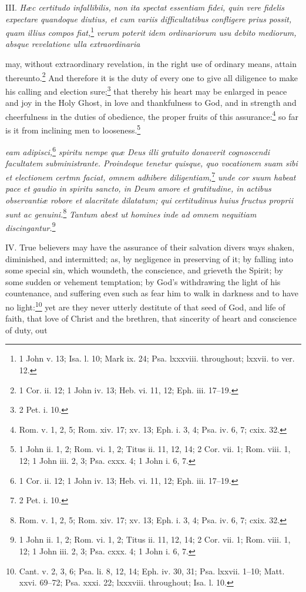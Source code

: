 III. \emph{Hæc certitudo infallibilis, non ita spectat essentiam fidei, quin vere fidelis expectare quandoque diutius, et cum variis difficultatibus confligere prius possit, quam illius compos fiat,}\footnote{1 John v. 13; Isa. l. 10; Mark ix. 24; Psa. lxxxviii. throughout; lxxvii. to ver. 12.}\emph{ verum poterit idem ordinariorum usu debito mediorum, absque revelatione ulla extraordinaria }

may, without extraordinary revelation, in the right use of ordinary means, attain thereunto.\footnote{1 Cor. ii. 12; 1 John iv. 13; Heb. vi. 11, 12; Eph. iii. 17–19.} And therefore it is the duty of every one to give all diligence to make his calling and election sure;\footnote{2 Pet. i. 10.} that thereby his heart may be enlarged in peace and joy in the Holy Ghost, in love and thankfulness to God, and in strength and cheerfulness in the duties of obedience, the proper fruits of this assurance:\footnote{Rom. v. 1, 2, 5; Rom. xiv. 17; xv. 13; Eph. i. 3, 4; Psa. iv. 6, 7; cxix. 32.} so far is it from inclining men to looseness.\footnote{1 John ii. 1, 2; Rom. vi. 1, 2; Titus ii. 11, 12, 14; 2 Cor. vii. 1; Rom. viii. 1, 12; 1 John iii. 2, 3; Psa. cxxx. 4; 1 John i. 6, 7.}

\emph{eam adipisci,}\footnote{1 Cor. ii. 12; 1 John iv. 13; Heb. vi. 11, 12; Eph. iii. 17–19.}\emph{ spiritu nempe quæ Deus illi gratuito donaverit cognoscendi facultatem subministrante. Proindeque tenetur quisque, quo vocationem suam sibi et electionem certmn faciat, omnem adhibere diligentiam,}\footnote{2 Pet. i. 10.}\emph{ unde cor suum habeat pace et gaudio in spiritu sancto, in Deum amore et gratitudine, in actibus observantiæ robore et alacritate dilatatum; qui certitudinus huius fructus proprii sunt ac genuini.}\footnote{Rom. v. 1, 2, 5; Rom. xiv. 17; xv. 13; Eph. i. 3, 4; Psa. iv. 6, 7; cxix. 32.}\emph{ Tantum abest ut homines inde ad omnem nequitiam discingantur.}\footnote{1 John ii. 1, 2; Rom. vi. 1, 2; Titus ii. 11, 12, 14; 2 Cor. vii. 1; Rom. viii. 1, 12; 1 John iii. 2, 3; Psa. cxxx. 4; 1 John i. 6, 7.}

IV. True believers may have the assurance of their salvation divers ways shaken, diminished, and intermitted; as, by negligence in preserving of it; by falling into some special sin, which woundeth, the conscience, and grieveth the Spirit; by some sudden or vehement temptation; by God's withdrawing the light of his countenance, and suffering even such as fear him to walk in darkness and to have no light:\footnote{Cant. v. 2, 3, 6; Psa. li. 8, 12, 14; Eph. iv. 30, 31; Psa. lxxvii. 1–10; Matt. xxvi. 69–72; Psa. xxxi. 22; lxxxviii. throughout; Isa. l. 10.} yet are they never utterly destitute of that seed of God, and life of faith, that love of Christ and the brethren, that sincerity of heart and conscience of duty, out

